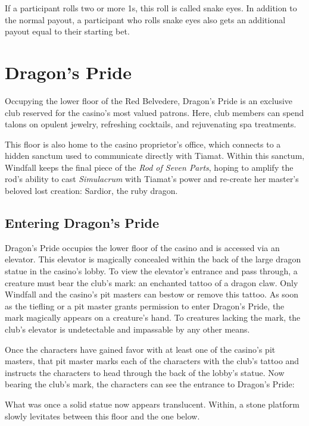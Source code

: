 \documentclass[10pt,a4paper,twoside,bg=print,twocolumn,openany,nodeprecatedcode]{dndbook}
\begin{document}
If a participant rolls two or more 1s, this roll is called snake eyes. In addition to the normal payout, a participant who rolls snake eyes also gets an additional payout equal to their starting bet.

\section{Dragon's Pride}
Occupying the lower floor of the Red Belvedere, Dragon's Pride is an exclusive club reserved for the casino's most valued patrons. Here, club members can spend talons on opulent jewelry, refreshing cocktails, and rejuvenating spa treatments.

This floor is also home to the casino proprietor's office, which connects to a hidden sanctum used to communicate directly with Tiamat. Within this sanctum, Windfall keeps the final piece of the \textit{Rod of Seven Parts}, hoping to amplify the rod's ability to cast \textit{Simulacrum} with Tiamat's power and re-create her master's beloved lost creation: Sardior, the ruby dragon.

\subsection{Entering Dragon's Pride}
Dragon's Pride occupies the lower floor of the casino and is accessed via an elevator. This elevator is magically concealed within the back of the large dragon statue in the casino's lobby. To view the elevator's entrance and pass through, a creature must bear the club's mark: an enchanted tattoo of a dragon claw. Only Windfall and the casino's pit masters can bestow or remove this tattoo. As soon as the tiefling or a pit master grants permission to enter Dragon's Pride, the mark magically appears on a creature's hand. To creatures lacking the mark, the club's elevator is undetectable and impassable by any other means.

Once the characters have gained favor with at least one of the casino's pit masters, that pit master marks each of the characters with the club's tattoo and instructs the characters to head through the back of the lobby's statue. Now bearing the club's mark, the characters can see the entrance to Dragon's Pride:

\begin{DndReadAloud}{}
What was once a solid statue now appears translucent. Within, a stone platform slowly levitates between this floor and the one below.

\end{DndReadAloud}
\end{document}
